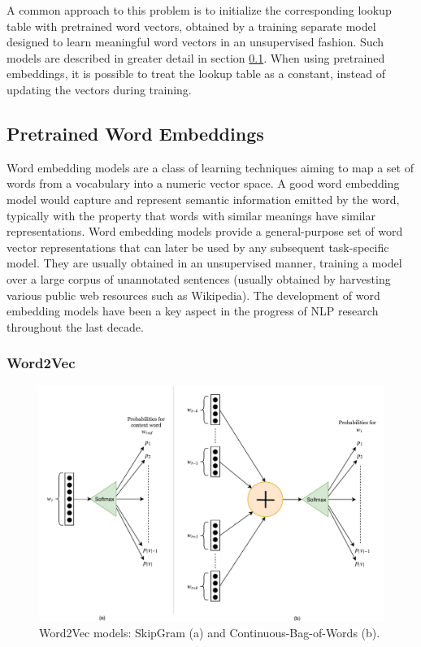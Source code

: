 A common approach to this problem is to initialize the corresponding lookup table with pretrained word vectors, obtained by a training separate model designed to learn meaningful word vectors in an unsupervised fashion. Such models are described in greater detail in section \ref{section:wordembeddings}. When using pretrained embeddings, it is possible to treat the lookup table as a constant, instead of updating the vectors during training. 

\subsection{Pretrained Word Embeddings} \label{section:wordembeddings}
Word embedding models are a class of learning techniques aiming to map a set of words from a vocabulary into a numeric vector space. A good word embedding model would capture and represent semantic information emitted by the word, typically with the property that words with similar meanings have similar representations. Word embedding models provide a general-purpose set of word vector representations that can later be used by any subsequent task-specific model. They are usually obtained in an unsupervised manner, training a model over a large corpus of unannotated sentences (usually obtained by harvesting various public web resources such as Wikipedia). The development of word embedding models have been a key aspect in the progress of NLP research throughout the last decade.

\subsubsection{Word2Vec}

\begin{figure}
    \centering
    \includegraphics[width=1\textwidth]{Figures/word2vec.pdf}
    \caption{Word2Vec models: SkipGram (a) and Continuous-Bag-of-Words (b).}
    \label{fig:word2vec}
\end{figure}

